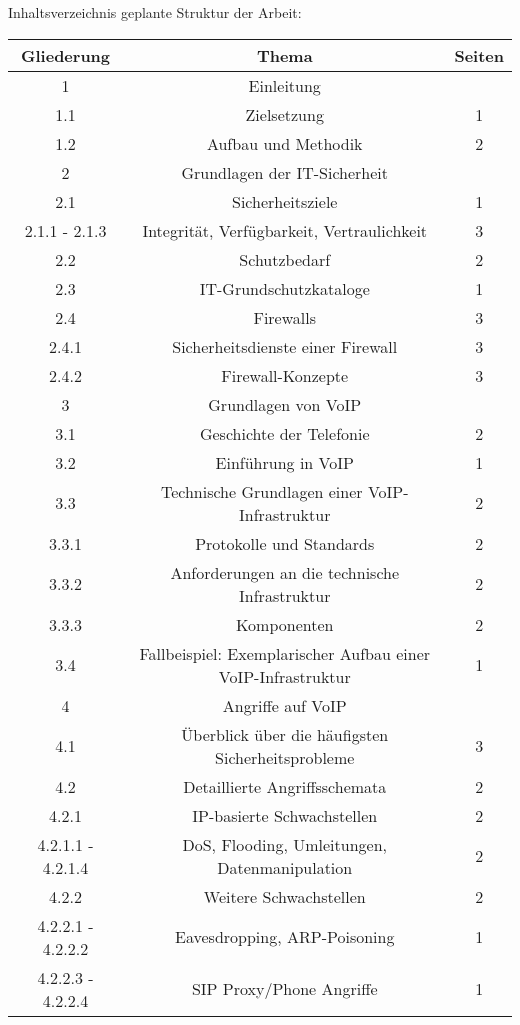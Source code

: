 \documentclass[a4paper,11pt,ngerman]{INSOexpose}
\begin{document}
\begin{section}{Inhaltsverzeichnis}
geplante Struktur der Arbeit:
\\
\renewcommand{\arraystretch}{2.2}
\begin{longtable}{c|c|c}
\textbf{Gliederung} & \textbf{Thema} & \textbf{Seiten} \\ 
\hline 

1 & Einleitung & \\ 
1.1 & Zielsetzung & 1 \\ 
1.2 & Aufbau und Methodik & 2 \\ 
2 & Grundlagen der IT-Sicherheit &  \\ 
2.1 & Sicherheitsziele & 1 \\ 
2.1.1 - 2.1.3 & Integrität, Verfügbarkeit, Vertraulichkeit & 3 \\ 
2.2 & Schutzbedarf & 2 \\ 
2.3 & IT-Grundschutzkataloge & 1 \\ 
2.4 & Firewalls & 3 \\ 
2.4.1 & Sicherheitsdienste einer Firewall & 3 \\
2.4.2 & Firewall-Konzepte & 3 \\
3 & Grundlagen von VoIP &  \\ 
3.1 & Geschichte der Telefonie & 2 \\ 
3.2 & Einführung in VoIP & 1 \\ 
3.3 & Technische Grundlagen einer VoIP-Infrastruktur & 2 \\
3.3.1 & Protokolle und Standards & 2 \\ 
3.3.2 & Anforderungen an die technische Infrastruktur & 2 \\ 
3.3.3 & Komponenten & 2 \\ 
3.4 & Fallbeispiel: Exemplarischer Aufbau einer VoIP-Infrastruktur & 1 \\ 
4 & Angriffe auf VoIP &  \\ 
4.1 & Überblick über die häufigsten Sicherheitsprobleme & 3 \\ 
4.2 & Detaillierte Angriffsschemata & 2 \\ 
4.2.1 & IP-basierte Schwachstellen & 2 \\ 
4.2.1.1 - 4.2.1.4 & DoS, Flooding, Umleitungen, Datenmanipulation & 2 \\ 
4.2.2 & Weitere Schwachstellen & 2 \\
4.2.2.1 - 4.2.2.2 & Eavesdropping, ARP-Poisoning & 1 \\ 
4.2.2.3 - 4.2.2.4 & SIP Proxy/Phone Angriffe & 1 \\ 

\end{longtable}
\end{section}
\end{document}
